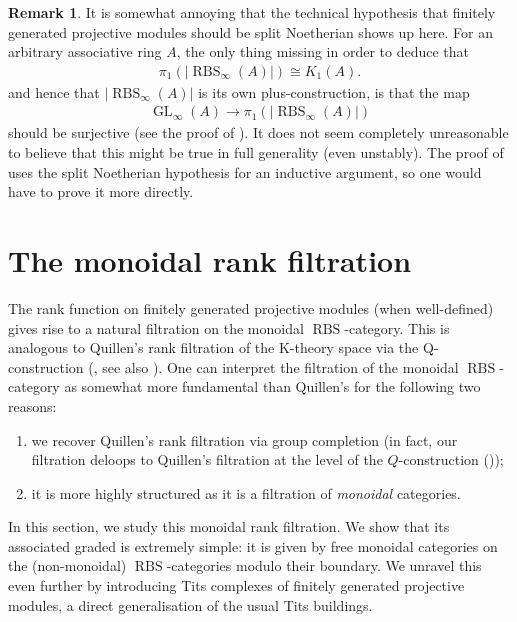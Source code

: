 \documentclass[12pt, reqno]{amsart}
\theoremstyle{plain}
\theoremstyle{definition}
\newtheorem{remark}[theorem]{Remark}
\begin{document}
\begin{remark}\label{get rid of split Noetherian hypothesis}
It is somewhat annoying that the technical hypothesis that finitely generated projective modules should be split Noetherian shows up here. For an arbitrary associative ring $A$, the only thing missing in order to deduce that
\begin{align*}
\pi_1(|\operatorname{RBS}_\infty(A)|) \cong K_1(A).
\end{align*}
and hence that $|\operatorname{RBS}_\infty(A)|$ is its own plus-construction, is that the map
\begin{align*}
\operatorname{GL}_\infty(A) \rightarrow \pi_1(|\operatorname{RBS}_\infty(A)|)
\end{align*}
should be surjective (see the proof of \cite[Theorem 5.9]{ClausenOrsnesJansen}). It does not seem completely unreasonable to believe that this might be true in full generality (even unstably). The proof of \cite[Theorem 5.9]{ClausenOrsnesJansen} uses the split Noetherian hypothesis for an inductive argument, so one would have to prove it more directly.
\end{remark}

\section{The monoidal rank filtration}\label{monoidal rank filtration}

The rank function on finitely generated projective modules (when well-defined) gives rise to a natural filtration on the monoidal $\operatorname{RBS}$-category. This is analogous to Quillen's rank filtration of the K-theory space via the Q-construction (\cite{Quillen73a}, see also ). One can interpret the filtration of the monoidal $\operatorname{RBS}$-category as somewhat more fundamental than Quillen's for the following two reasons:
\begin{enumerate}
\item we recover Quillen's rank filtration via group completion (in fact, our filtration deloops to Quillen's filtration at the level of the $Q$-construction (\cite[Theorem 7.38]{ClausenOrsnesJansen}));
\item it is more highly structured as it is a filtration of \textit{monoidal} categories.
\end{enumerate}

In this section, we study this monoidal rank filtration. We show that its associated graded is extremely simple: it is given by free monoidal categories on the (non-monoidal) $\operatorname{RBS}$-categories modulo their boundary. We unravel this even further by introducing Tits complexes of finitely generated projective modules, a direct generalisation of the usual Tits buildings.
\end{document}
